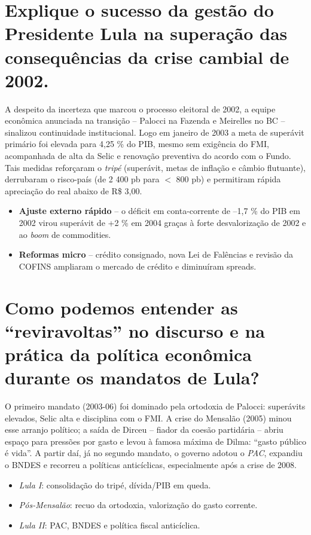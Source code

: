 \documentclass{sciposter}
\begin{document}
\begin{multicols}{3}
\section{\textbf{Explique o sucesso da gestão do Presidente Lula na superação das consequências da crise cambial de 2002.}}

A despeito da incerteza que marcou o processo eleitoral de 2002, a equipe econômica anunciada na transição – Palocci na Fazenda e Meirelles no BC – sinalizou continuidade institucional. Logo em janeiro de 2003 a meta de superávit primário foi elevada para 4{,}25 \% do PIB, mesmo sem exigência do FMI, acompanhada de alta da Selic e renovação preventiva do acordo com o Fundo. Tais medidas reforçaram o \emph{tripé} (superávit, metas de inflação e câmbio flutuante), derrubaram o risco-país (de 2 400 pb para \(<\) 800 pb) e permitiram rápida apreciação do real abaixo de R\$ 3,00. 

\begin{itemize}
  \item \textbf{Ajuste externo rápido} – o déficit em conta-corrente de –1,7 \% do PIB em 2002 virou superávit de +2 \% em 2004 graças à forte desvalorização de 2002 e ao \emph{boom} de commodities. 
  \item \textbf{Reformas micro} – crédito consignado, nova Lei de Falências e revisão da COFINS ampliaram o mercado de crédito e diminuíram spreads. 
\end{itemize}

\section{\textbf{Como podemos entender as “reviravoltas” no discurso e na prática da política econômica durante os mandatos de Lula?}}

O primeiro mandato (2003-06) foi dominado pela ortodoxia de Palocci: superávits elevados, Selic alta e disciplina com o FMI. A crise do Mensalão (2005) minou esse arranjo político; a saída de Dirceu – fiador da coesão partidária – abriu espaço para pressões por gasto e levou à famosa máxima de Dilma: “gasto público é vida”. A partir daí, já no segundo mandato, o governo adotou o \emph{PAC}, expandiu o BNDES e recorreu a políticas anticíclicas, especialmente após a crise de 2008. 

\begin{itemize}
  \item \emph{Lula I}: consolidação do tripé, dívida/PIB em queda. 
  \item \emph{Pós-Mensalão}: recuo da ortodoxia, valorização do gasto corrente. 
  \item \emph{Lula II}: PAC, BNDES e política fiscal anticíclica. 
\end{itemize}


\end{multicols}
\end{document}
